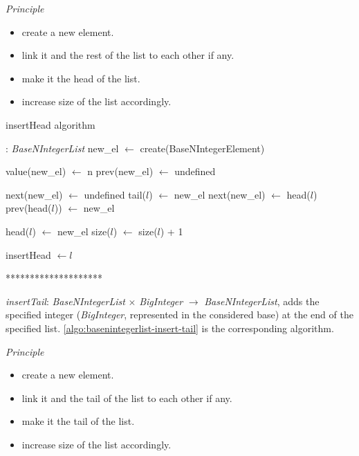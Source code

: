 \documentclass[book, nodocumentinfo]{upmethodology-document}
\newcommand{\separator}{\centerline{********************}}
\begin{document}
\emph{Principle}
\begin{itemize}
    \item create a new element.
    \item link it and the rest of the list to each other if any.
    \item make it the head of the list.
    \item increase size of the list accordingly.
\end{itemize}

\begin{algorithm}[H]
    \caption{insertHead algorithm}
    \label{algo:basenintegerlist-insert-head}

    \begin{algorithmic}
         : \emph{BaseNIntegerList}
            \State new\_el \(\leftarrow\) create(BaseNIntegerElement)

            \State value(new\_el) \(\leftarrow\) n
            \State prev(new\_el) \(\leftarrow\) undefined

                \State next(new\_el) \(\leftarrow\) undefined
                \State tail(\(l\)) \(\leftarrow\) new\_el
            \Else
                \State next(new\_el) \(\leftarrow\) head(\(l\))
                \State prev(head(\(l\))) \(\leftarrow\) new\_el
            \EndIf

            \State head(\(l\)) \(\leftarrow\) new\_el
            \State size(\(l\)) \(\leftarrow\) size(\(l\)) + 1

            \State insertHead \(\leftarrow l\)
        \EndFunction
    \end{algorithmic}
\end{algorithm}

\separator

\emph{insertTail}: \emph{BaseNIntegerList} \(×\) \emph{BigInteger} \(\rightarrow\) \emph{BaseNIntegerList},
adds the specified integer (\emph{BigInteger}, represented in the considered base) at the end
of the specified list.
\ref{algo:basenintegerlist-insert-tail} is the corresponding algorithm.

\emph{Principle}
\begin{itemize}
    \item create a new element.
    \item link it and the tail of the list to each other if any.
    \item make it the tail of the list.
    \item increase size of the list accordingly.
\end{itemize}
\end{document}
